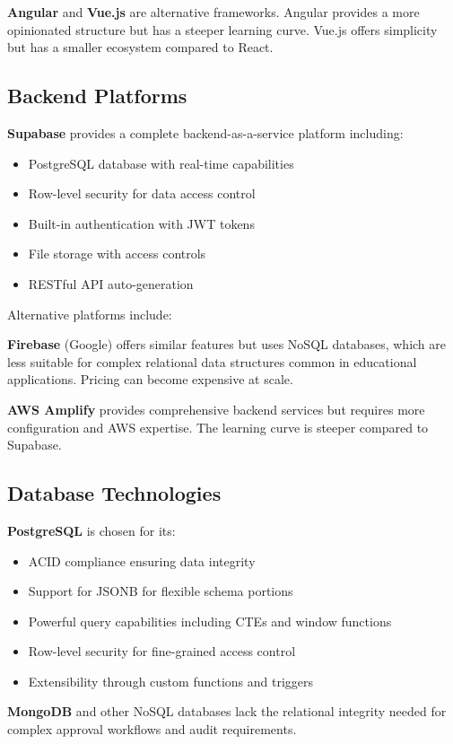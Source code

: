 \textbf{Angular} and \textbf{Vue.js} are alternative frameworks. Angular provides a more opinionated structure but has a steeper learning curve. Vue.js offers simplicity but has a smaller ecosystem compared to React.

\subsection{Backend Platforms}

\textbf{Supabase} provides a complete backend-as-a-service platform including:
\begin{itemize}
\item PostgreSQL database with real-time capabilities
\item Row-level security for data access control
\item Built-in authentication with JWT tokens
\item File storage with access controls
\item RESTful API auto-generation
\end{itemize}

Alternative platforms include:

\textbf{Firebase} (Google) offers similar features but uses NoSQL databases, which are less suitable for complex relational data structures common in educational applications. Pricing can become expensive at scale.

\textbf{AWS Amplify} provides comprehensive backend services but requires more configuration and AWS expertise. The learning curve is steeper compared to Supabase.

\subsection{Database Technologies}

\textbf{PostgreSQL} is chosen for its:
\begin{itemize}
\item ACID compliance ensuring data integrity
\item Support for JSONB for flexible schema portions
\item Powerful query capabilities including CTEs and window functions
\item Row-level security for fine-grained access control
\item Extensibility through custom functions and triggers
\end{itemize}

\textbf{MongoDB} and other NoSQL databases lack the relational integrity needed for complex approval workflows and audit requirements.


